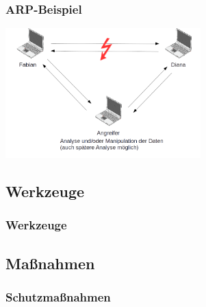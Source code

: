 \documentclass{beamer}
\begin{document}
	   	\begin{frame}
	   		\frametitle{ARP-Beispiel}
	   		\includegraphics[height=5.0cm]{ARP-Tabelle-manipuliert_1.png}
	   	\end{frame}
    	
    	\subsection*{Werkzeuge}
		\begin{frame}
        	\frametitle{Werkzeuge}
                       	
    	\end{frame}
    	\subsection*{Maßnahmen}
		\begin{frame}
        	\frametitle{Schutzmaßnahmen}
                       	
    	\end{frame}    
\end{document}

